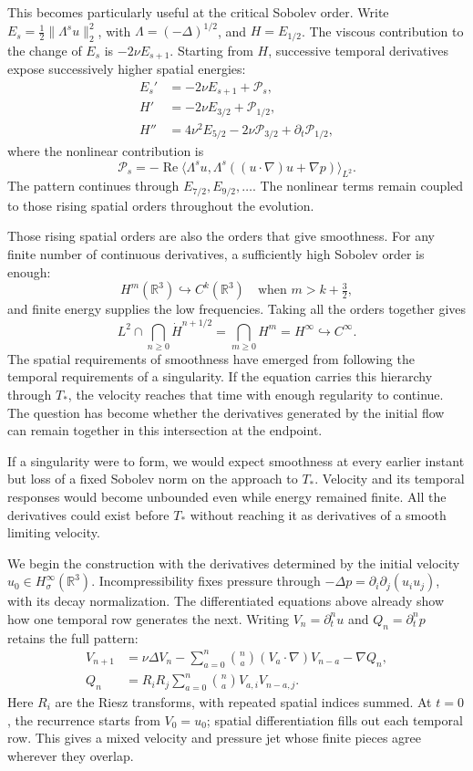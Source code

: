 This becomes particularly useful at the critical Sobolev order. Write
\(E_s=\tfrac12\|\Lambda^su\|_2^2\), with
\(\Lambda=(-\Delta)^{1/2}\), and \(H=E_{1/2}\). The viscous contribution
to the change of \(E_s\) is \(-2\nu E_{s+1}\). Starting from \(H\),
successive temporal derivatives expose successively higher spatial energies:
\[
 \begin{aligned}
 E_s'&=-2\nu E_{s+1}+\mathcal P_s,\\
 H'&=-2\nu E_{3/2}+\mathcal P_{1/2},\\
 H''&=4\nu^2E_{5/2}-2\nu\mathcal P_{3/2}
       +\partial_t\mathcal P_{1/2},
 \end{aligned}
\]
where the nonlinear contribution is
\[
 \mathcal P_s=-\operatorname{Re}\langle\Lambda^su,
 \Lambda^s((u\cdot\nabla)u+\nabla p)\rangle_{L^2}.
\]
The pattern continues through \(E_{7/2},E_{9/2},\ldots\). The nonlinear
terms remain coupled to those rising spatial orders throughout the evolution.

Those rising spatial orders are also the orders that give smoothness.
For any finite number of continuous derivatives, a sufficiently high
Sobolev order is enough:
\[
 H^m(\mathbb R^3)\hookrightarrow C^k(\mathbb R^3)
 \quad\text{when }m>k+\tfrac32,
\]
and finite energy supplies the low frequencies. Taking all the orders
together gives
\[
 L^2\cap\bigcap_{n\ge0}\dot H^{n+1/2}
 =\bigcap_{m\ge0}H^m
 =H^\infty\hookrightarrow C^\infty.
\]
The spatial requirements of smoothness have emerged from following the
temporal requirements of a singularity. If the equation carries this hierarchy through
\(T_*\), the velocity reaches that time with enough regularity to continue.
The question has become whether the derivatives generated by the initial
flow can remain together in this intersection at the endpoint.

If a singularity were to form, we would expect smoothness at every earlier
instant but loss of a fixed Sobolev norm on the approach to \(T_*\).
Velocity and its temporal responses would become unbounded even while
energy remained finite. All the derivatives could exist before \(T_*\)
without reaching it as derivatives of a smooth limiting velocity.

We begin the construction with the derivatives determined by the initial
velocity \(u_0\in H^\infty_\sigma(\mathbb R^3)\). Incompressibility fixes
pressure through \(-\Delta p=\partial_i\partial_j(u_i u_j)\), with its
decay normalization. The differentiated equations above already show how
one temporal row generates the next. Writing
\(V_n=\partial_t^nu\) and \(Q_n=\partial_t^np\) retains the full pattern:
\[
 \begin{aligned}
 V_{n+1}&=\nu\Delta V_n
 -\sum_{a=0}^n\binom na(V_a\cdot\nabla)V_{n-a}-\nabla Q_n,\\
 Q_n&=R_iR_j\sum_{a=0}^n\binom na V_{a,i}V_{n-a,j}.
 \end{aligned}
\]
Here \(R_i\) are the Riesz transforms, with repeated spatial indices
summed. At \(t=0\), the recurrence starts from \(V_0=u_0\); spatial
differentiation fills out each temporal row. This gives a mixed velocity
and pressure jet whose finite pieces agree wherever they overlap.

